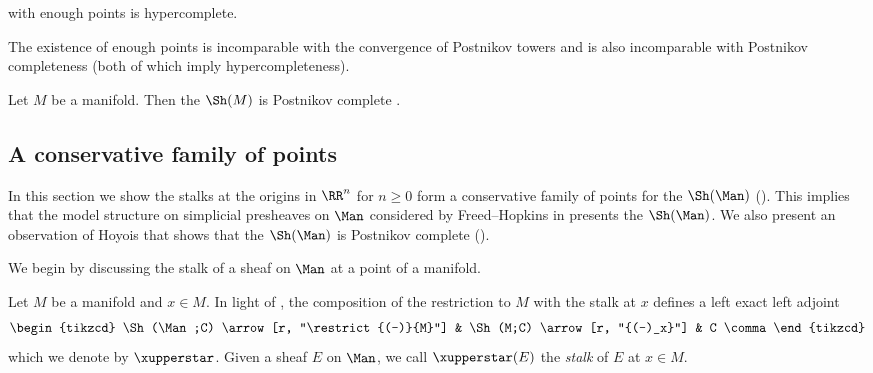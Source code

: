 \begin{example}\label{exm:enoughpointsishypercomplete}
	\Atopos with enough points is hypercomplete.
\end{example}

\begin{remark}
	The existence of enough points is incomparable with the convergence of Postnikov towers and is also incomparable with Postnikov completeness (both of which imply hypercompleteness).
\end{remark}

\begin{example}\label{ex:ShMPostnikovcomplete}
	Let $ M $ be a manifold. 
	Then the \topos $ \Sh(M) $ is Postnikov complete \cite[ \& ]{HTT}.
\end{example}


\subsection{A conservative family of points}\label{subsec:points}

In this section we show the stalks at the origins in $ \RR^n $ for $ n \geq 0 $ form a conservative family of points for the \topos $ \Sh(\Man) $ ().
This implies that the model structure on simplicial presheaves on $ \Man $ considered by Freed--Hopkins in \cite[\S 5]{MR3049871} presents the \topos $ \Sh(\Man) $.
We also present an observation of Hoyois that shows that the \topos $ \Sh(\Man) $ is Postnikov complete ().

We begin by discussing the stalk of a sheaf on $ \Man $ at a point of a manifold.

\begin{construction}\label{cons:stalk}
	Let $ M $ be a manifold and $ x \in M $.
	In light of , the composition of the restriction to $ M $ with the stalk at $ x $ defines a left exact left adjoint
	\begin{equation*}
		\begin{tikzcd} 
			\Sh(\Man;C) \arrow[r, "\restrict{(-)}{M}"] & \Sh(M;C) \arrow[r, "{(-)_x}"] & C \comma
		\end{tikzcd}
	\end{equation*}
	which we denote by $ \xupperstar $.
	Given a sheaf $ E $ on $ \Man $, we call $ \xupperstar(E) $ the \textit{stalk} of $ E $ at $ x \in M $.
\end{construction}

